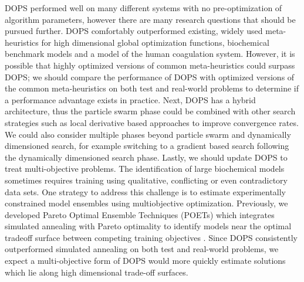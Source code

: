 \documentclass{bmcart}
\begin{document}

DOPS performed well on many different systems with no pre-optimization of algorithm parameters, however there are many research questions that should be pursued further.
DOPS comfortably outperformed existing, widely used meta-heuristics for high dimensional global optimization functions, biochemical benchmark models and a model of the human coagulation system.
However, it is possible that highly optimized versions of common meta-heuristics could surpass DOPS;
we should compare the performance of DOPS with optimized versions of the common
meta-heuristics on both test and real-world problems to determine if a performance advantage exists in practice.
Next, DOPS has a hybrid architecture, thus the particle swarm phase could be combined with other search strategies such as local derivative based approaches to improve convergence rates.
We could also consider multiple phases beyond particle swarm and dynamically dimensioned search, for example switching to a gradient based search following the dynamically
dimensioned search phase.
Lastly, we should update DOPS to treat multi-objective problems.
The identification of large biochemical models sometimes requires training using qualitative, conflicting or even contradictory data sets.
One strategy to address this challenge is to estimate experimentally constrained model ensembles using multiobjective optimization.
Previously, we developed Pareto Optimal Ensemble Techniques (POETs) which integrates simulated annealing with Pareto optimality
to identify models near the optimal tradeoff surface between competing training objectives \cite{song2010ensembles}.
Since DOPS consistently outperformed simulated annealing on both test and real-world problems, we expect a multi-objective form of DOPS would more quickly estimate solutions
which lie along high dimensional trade-off surfaces.
\end{document}
